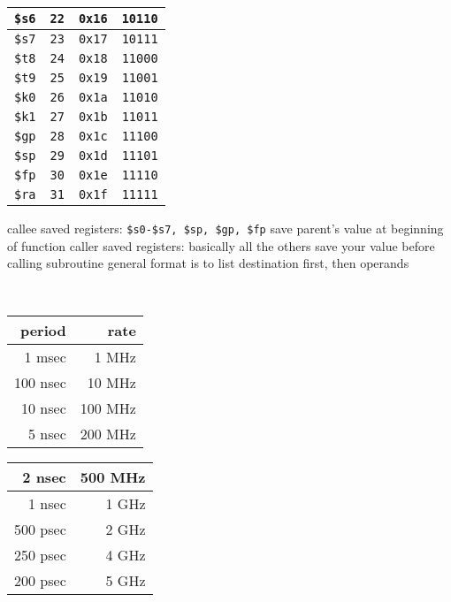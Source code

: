 \documentclass[12pt]{article}
\begin{document}
\begin{spacing}{0.9}
\begin{multicols*}{2}
\begin{flushleft}
\begin{outline}[longenum]
\begin{tabular}{|l r l l|}
  \verb|$s6| & \verb|22| & \verb|0x16| & \verb|10110| \\ \hline
  \verb|$s7| & \verb|23| & \verb|0x17| & \verb|10111| \\ \hline \hline
  \verb|$t8| & \verb|24| & \verb|0x18| & \verb|11000| \\ \hline
  \verb|$t9| & \verb|25| & \verb|0x19| & \verb|11001| \\ \hline \hline
  \verb|$k0| & \verb|26| & \verb|0x1a| & \verb|11010| \\ \hline
  \verb|$k1| & \verb|27| & \verb|0x1b| & \verb|11011| \\ \hline
  \verb|$gp| & \verb|28| & \verb|0x1c| & \verb|11100| \\ \hline
  \verb|$sp| & \verb|29| & \verb|0x1d| & \verb|11101| \\ \hline
  \verb|$fp| & \verb|30| & \verb|0x1e| & \verb|11110| \\ \hline
  \verb|$ra| & \verb|31| & \verb|0x1f| & \verb|11111| \\ \hline
  \end{tabular}
  \1 callee saved registers: \verb|$s0-$s7, $sp, $gp, $fp|
    \2 save parent's value at beginning of function
  \1 caller saved registers: basically all the others
    \2 save your value before calling subroutine
  \1 general format is to list destination first, then operands

\\
\begin{tabular}{|r r|}    \hline
  period   & rate    \\ \hline
    1 msec &   1 MHz \\ \hline
  100 nsec &  10 MHz \\ \hline
   10 nsec & 100 MHz \\ \hline
    5 nsec & 200 MHz \\ \hline
\end{tabular}
\begin{tabular}{|r r|}    \hline
    2 nsec & 500 MHz \\ \hline
    1 nsec & 1 GHz   \\ \hline
  500 psec & 2 GHz   \\ \hline
  250 psec & 4 GHz   \\ \hline
  200 psec & 5 GHz   \\ \hline
\end{tabular}


\end{outline}
\end{flushleft}
\end{multicols*}
\end{spacing}
\end{document}
